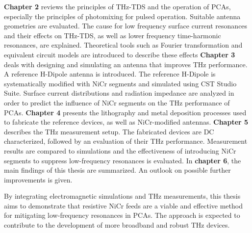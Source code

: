 \textbf{Chapter 2} reviews the principles of THz-TDS and the operation of PCAs, especially the principles of photomixing for pulsed operation. Suitable antenna geometries are evaluated. The cause for low frequency surface current resonances and their effects on THz-TDS, as well as lower frequency time-harmonic resonances, are explained. Theoretical tools such as Fourier transformation and equivalent circuit models are introduced to describe these effects 
\textbf{Chapter 3} deals with designing and simulating an antenna that improves THz performance. A reference H-Dipole antenna is introduced. 
The reference H-Dipole is systematically modified with NiCr segments and simulated using CST Studio Suite. Surface current distributions and radiation impedance are analyzed in order to predict the influence of NiCr segments on the THz performance of PCAs. \textbf{Chapter 4} presents the lithography and metal deposition processes used to fabricate the reference devices, as well as NiCr-modified antennas. \textbf{Chapter 5} describes the THz measurement setup. The fabricated devices are DC characterized, followed by an evaluation of their THz performance. Measurement results are compared to simulations and the effectiveness of introducing  NiCr segments to suppress low-frequency resonances is evaluated. In
\textbf{chapter 6}, the main findings of this thesis are summarized. An outlook on possible further improvements is given. 

By integrating electromagnetic simulations and THz measurements, this thesis aims to demonstrate that resistive NiCr feeds are a viable and effective method for mitigating low-frequency resonances in PCAs. The approach is expected to contribute to the development of more broadband and robust THz devices.